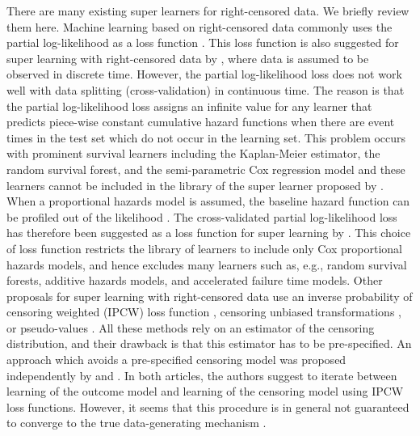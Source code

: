 \documentclass[a4paper,danish]{article}
\theoremstyle{plain} %
\numberwithin{theorem}{section}
\theoremstyle{definition} %
\theoremstyle{remark}
\newcommand{\1}{\mathds{1}}
\begin{document}
There are many existing super learners for right-censored
data. We briefly review them here. Machine learning based on
right-censored data commonly uses the partial log-likelihood
as a loss function
\citep[e.g.,][]{li2016regularized,yao2017deep,lee2018deephit,katzman2018deepsurv,gensheimer2019scalable,lee2021boosted,kvamme2021continuous}.
This loss function is also suggested for super learning with
right-censored data by \cite{polley2011-sl-cens}, where data
is assumed to be observed in discrete time. However, the
partial log-likelihood loss does not work well with data
splitting (cross-validation) in continuous time. The reason is
that the partial log-likelihood loss assigns an infinite value
for any learner that predicts piece-wise constant cumulative
hazard functions when there are event times in the test set
which do not occur in the learning set. This problem occurs
with prominent survival learners including the Kaplan-Meier
estimator, the random survival forest, and the semi-parametric
Cox regression model and these learners cannot be included in
the library of the super learner proposed by
\cite{polley2011-sl-cens}. When a proportional hazards model
is assumed, the baseline hazard function can be profiled out
of the likelihood \citep{cox1972regression}. The
cross-validated partial log-likelihood loss
\citep{verweij1993cross} has therefore been suggested as a
loss function for super learning by \cite{golmakani2020super}.
This choice of loss function restricts the library of learners
to include only Cox proportional hazards models, and hence
excludes many learners such as, e.g., random survival forests,
additive hazards models, and accelerated failure time models.
Other proposals for super learning with right-censored data
use an inverse probability of censoring weighted (IPCW) loss
function
\citep{graf1999assessment,van2003unicv,molinaro2004tree,keles2004asymptotically,hothorn2006survival,gerds2006consistent,gonzalez2021stacked},
censoring unbiased transformations
\citep{fan1996local,steingrimsson2019censoring}, or
pseudo-values
\citep{andersen2003generalised,mogensen2013random,sachs2019ensemble}.
All these methods rely on an estimator of the censoring
distribution, and their drawback is that this estimator has to
be pre-specified. An approach which avoids a pre-specified
censoring model was proposed independently by
\cite{han2021inverse} and \cite{westling2021inference}. In
both articles, the authors suggest to iterate between learning
of the outcome model and learning of the censoring model using
IPCW loss functions. However, it seems that this procedure is
in general not guaranteed to converge to the true
data-generating mechanism
\citep[][Appendix~A.4]{munch2024thesis}.
\end{document}
